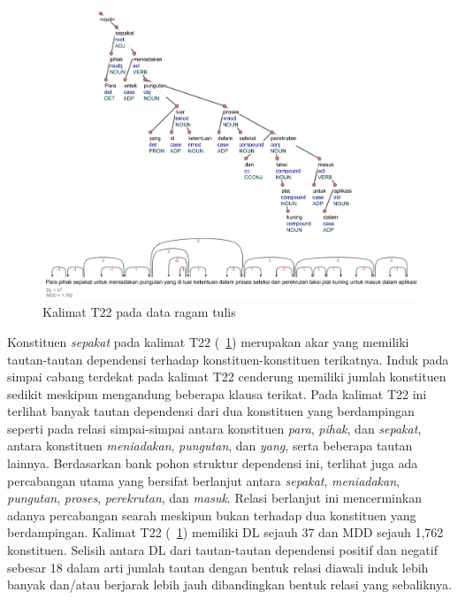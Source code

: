 \begin{figure}
	\centering \includegraphics[width=1
	\textwidth] {pics/ts3901.jpg} 
	\caption{Kalimat T22 pada data ragam tulis} 
	\label{fig:ts3901} 
\end{figure}

Konstituen \textit{sepakat} pada kalimat T22 (\pic~\ref{fig:ts3901}) merupakan akar yang memiliki tautan-tautan dependensi terhadap konstituen-konstituen terikatnya. Induk pada simpai cabang terdekat pada kalimat T22 cenderung memiliki jumlah konstituen sedikit meskipun mengandung beberapa klausa terikat. Pada kalimat T22 ini terlihat banyak tautan dependensi dari dua konstituen yang berdampingan seperti pada relasi simpai-simpai antara konstituen \textit{para}, \textit{pihak}, dan \textit{sepakat}, antara konstituen \textit{meniadakan}, \textit{pungutan}, dan \textit{yang}, serta beberapa tautan lainnya. Berdasarkan bank pohon struktur dependensi ini, terlihat juga ada percabangan utama yang bersifat berlanjut antara \textit{sepakat}, \textit{meniadakan}, \textit{pungutan}, \textit{proses}, \textit{perekrutan}, dan \textit{masuk}. Relasi berlanjut ini mencerminkan adanya percabangan searah meskipun bukan terhadap dua konstituen yang berdampingan. Kalimat T22 (\pic~\ref{fig:ts3901}) memiliki DL sejauh 37 dan MDD sejauh 1,762 konstituen. Selisih antara DL dari tautan-tautan dependensi positif dan negatif sebesar 18 dalam arti jumlah tautan dengan bentuk relasi diawali induk lebih banyak dan/atau berjarak lebih jauh dibandingkan bentuk relasi yang sebaliknya.


